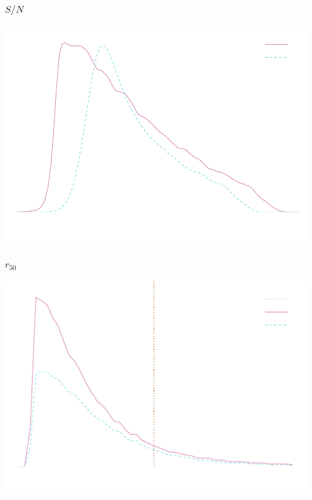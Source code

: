 \documentclass{beamer}
\newcommand{\snr}{$S/N$}
\begin{document}
\frame
{
    \frametitle{\snr}
 
    \begin{center}
        \includegraphics[width=\textwidth]{run-bdj03mcal01-s2n-inv.pdf}
        \newline
    \end{center}



}

\frame
{
    \frametitle{$r_{50}$}
 
    \begin{center}
        \includegraphics[width=\textwidth]{run-bdj03mcal01-r50-inv.pdf}
        \newline
    \end{center}



}
\end{document}
